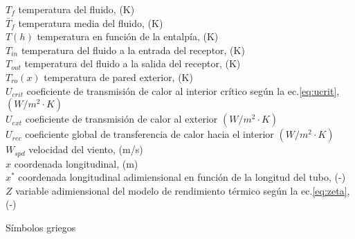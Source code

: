 \begin{tabbing}
$T_{f}$ \> temperatura del fluido, (K) \\
$\bar{T}_{f}$ \> temperatura media del fluido, (K) \\
$T(h)$ \> temperatura en función de la entalpía, (K) \\
$T_{in}$ \> temperatura del fluido a la entrada del receptor, (K) \\
$T_{out}$ \> temperatura del fluido a la salida del receptor, (K) \\
$T_{ro}(x)$ \> temperatura de pared exterior, (K) \\
$U_{crit}$ \>  coeficiente de transmisión de calor al interior crítico según la ec.\eqref{eq:ucrit}, $(W/m^{2}\cdot K)$  \\
$U_{ext}$ \> coeficiente de transmisión de calor al exterior $(W/m^{2}\cdot K)$  \\
$U_{rec}$  \> coeficiente global de transferencia de calor hacia el interior $(W/m^{2}\cdot K)$  \\
$W_{spd}$ \> velocidad del viento, (m/s) \\
$x$ \> coordenada longitudinal, (m) \\
$x^*$ \> coordenada longitudinal adimiensional en función de la longitud del tubo, (-) \\
$Z$ \> variable adimiensional del modelo de rendimiento térmico según la ec.\eqref{eq:zeta}, (-) \\
\end{tabbing}


Símbolos griegos

